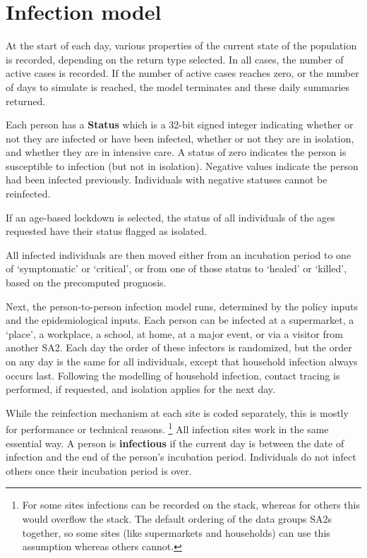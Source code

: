 \documentclass[submission]{grattan}
\newcommand*{\defi}[1]{\textbf{#1}}
\begin{document}
\section{Infection model}

At the start of each day, various properties of the current state of the population is recorded,
depending on the return type selected. In all cases, the number of active cases is recorded.
If the number of active cases reaches zero, or the number of days to simulate is reached, the model
 terminates and these daily summaries returned.

Each person has a \textbf{Status} which is a 32-bit signed integer indicating whether or not
they are infected or have been infected, whether or not they are in isolation, and whether they are
in intensive care. A status of zero indicates the person is susceptible to infection (but not
in isolation). Negative values indicate the person had been infected previously. Individuals with
negative statuses cannot be reinfected.


If an age-based lockdown is selected, the status of  all individuals of the ages requested have their
status flagged as isolated.

All infected individuals are then moved either from an incubation period to one of
`symptomatic' or `critical', or from one of those status to `healed' or `killed', based
on the precomputed prognosis.

Next, the person-to-person infection model runs, determined by the policy inputs and
the epidemiological inputs. Each person can be infected at a supermarket, a `place',
a workplace, a school, at home, at a major event, or via a visitor from another SA2. Each day
the order of these infectors is randomized, but the order on any day is the same for
all individuals, except that household infection always
occurs last. Following the modelling of household infection, contact tracing is performed,
if requested, and isolation applies for the next day.

While the reinfection mechanism at each site is coded separately, this is mostly for
performance or technical reasons.%
	\footnote{For some sites infections can be recorded on the stack, whereas for others this would
	overflow the stack. The default ordering of the data groups SA2s together, so some sites
	(like supermarkets and households) can use this assumption whereas others cannot.}
All infection sites work in the same essential way. 
A person is \defi{infectious} if the current day is between the date of infection and the
end of the person's incubation period. 
Individuals do not infect others once their incubation period is over.
\end{document}
